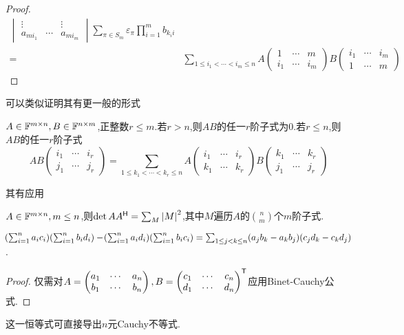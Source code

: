 \documentclass[openany]{book}
\begin{document}
\begin{proof}
$$\begin{aligned}
\begin{vmatrix}
        \vdots&&\vdots\\
        a_{mi_1}&\cdots&a_{mi_m}
    \end{vmatrix}\sum_{\pi\in S_m}\varepsilon_\pi\prod_{i=1}^{m}b_{k_ii}\\
    =&\sum_{1\leq i_1<\cdots<i_m\leq n}A\begin{pmatrix}
        1&\cdots&m\\i_1&\cdots&i_m
    \end{pmatrix}B\begin{pmatrix}
        i_1&\cdots&i_m\\1&\cdots&m
    \end{pmatrix}
    \end{aligned}$$
\end{proof}
可以类似证明其有更一般的形式
\begin{theorem}
    $A\in \mathbb{F}^{m\times n},B\in \mathbb{F}^{n\times m}$,正整数$r\leq m$.若$r>n$,则$AB$的任一$r$阶子式为0.若$r\leq n$,则$AB$的任一$r$阶子式
    $$AB\begin{pmatrix}
        i_1&\cdots&i_r\\
        j_1&\cdots&j_r
    \end{pmatrix}=\sum_{1\leq k_1<\cdots<k_r\leq n}A\begin{pmatrix}
        i_1&\cdots&i_r\\
        k_1&\cdots&k_r
    \end{pmatrix}B\begin{pmatrix}
        k_1&\cdots&k_r\\
        j_1&\cdots&j_r
    \end{pmatrix}$$
\end{theorem}
其有应用
\begin{proposition}
    $A\in\mathbb{F}^{m\times n},m\leq n$,则$\det AA^{\mathsf{H}}=\sum_{M}\left|M\right|^2$,其中$M$遍历$A$的$\binom{n}{m}$个$m$阶子式.
\end{proposition}
\begin{proposition}[Cauchy恒等式]
    $\!\left(\sum_{i=1}^n a_ic_i\right)\!\left(\sum_{i=1}^n b_id_i\right)-\!\left(\sum_{i=1}^n a_id_i\right)\!\left(\sum_{i=1}^n b_ic_i\right)=\sum_{1\leq j<k\leq n}(a_jb_k-a_kb_j)(c_jd_k-c_kd_j)$.
\end{proposition}
\begin{proof}
    仅需对$A=\begin{pmatrix}
        a_1&\cdots&a_n\\
        b_1&\cdots&b_n
    \end{pmatrix},B=\begin{pmatrix}
        c_1&\cdots&c_n\\
        d_1&\cdots&d_n
    \end{pmatrix}^{\mathsf{T}}$应用Binet-Cauchy公式.
\end{proof}
这一恒等式可直接导出$n$元Cauchy不等式.
\end{document}
